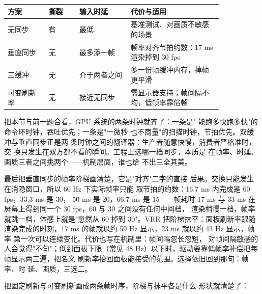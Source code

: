 \begin{longtable}{L{0.16\linewidth}L{0.12\linewidth}L{0.2\linewidth}L{0.36\linewidth}}
\toprule
方案 & 撕裂 & 输入时延 & 代价与适用 \\
\midrule
无同步 & 有 & 最低 & 基准测试、对画质不敏感的场景 \\
垂直同步 & 无 & 最多添一帧 & 帧率对齐节拍约数：17 ms 渲染掉到 30 fps \\
三缓冲 & 无 & 介于两者之间 & 多一份帧缓冲内存，掉帧更平滑 \\
可变刷新率 & 无 & 接近无同步 & 需显示器支持；帧间隔不均，低帧率靠倍帧 \\
\bottomrule
\end{longtable}

把本节与前一题合看，GPU 系统的两条时钟就齐了：一条是"
能跑多快跑多快"的命令环时钟，吞吐优先；一条是"一微秒
也不商量"的扫描时钟，节拍优先。双缓冲与垂直同步正是两
条时钟之间的翻译器：生产者随意快慢，消费者严格准时，交
换只发生在双方都不看的瞬间。工程上选哪一档同步，本质是
在帧率、时延、画质三者之间挑两个——机制层面，谁也给
不出三全其美。

最后把垂直同步的帧率阶梯画清楚，它是"对齐"二字的直接
后果。交换只能发生在消隐窗口，所以 60 Hz 下实际帧率只能
取节拍的约数：16.7 ms 内完成是 60 fps，33.3 ms 是 30，
50 ms 是 20，66.7 ms 是 15——帧耗时 17 ms 与 33 ms 在
屏幕上得到同一个 30 fps，60 与 30 之间没有任何中间档，
渲染稍慢一档，帧率就跳一档，体感上就是"忽然从 60 掉到
30"。VRR 把阶梯抹平：面板刷新率跟随渲染完成的时刻，17
ms 的帧就以约 59 Hz 显示，23 ms 就以约 43 Hz 显示，帧率
第一次可以连续变化。代价也写在机制里：帧间隔忽长忽短，
对帧间隔敏感的人会觉得"不匀"；低到面板下限（常见 48
Hz）以下时，驱动要靠低帧率补偿把每帧显示两三遍，把名义
刷新率抬回面板能接受的范围。选择依旧回到那句：帧率、时
延、画质，三选二。

把固定刷新与可变刷新画成两条帧时序，阶梯与抹平各是什么
形状就清楚了：

